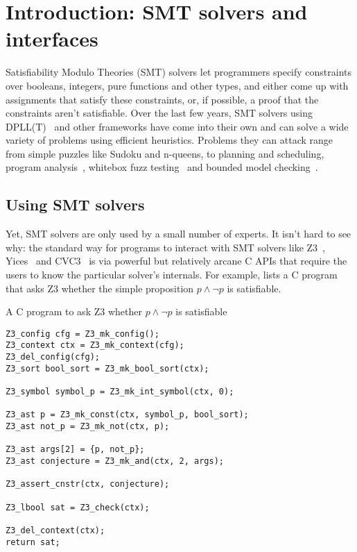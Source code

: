 \chapter{Introduction: SMT solvers and interfaces}
\label{chap:intro}

Satisfiability Modulo Theories (SMT) solvers let programmers specify constraints
over booleans, integers, pure functions and other types, and either come up
with assignments that satisfy these constraints, or, if possible, a proof that
the constraints aren't satisfiable. Over the last few years, SMT solvers using
DPLL(T)~\cite{dpllt:04} and other frameworks have come into their own and can
solve a wide variety of problems using efficient heuristics. Problems they can
attack range from simple puzzles like Sudoku and n-queens, to planning and
scheduling, program analysis~\cite{Gulwani:08}, whitebox fuzz
testing~\cite{Godefroid:08} and bounded model checking~\cite{Armando:09}.

\section{Using SMT solvers}
\label{sec:usingsmt}

Yet, SMT solvers are only used by a small number of experts. It isn't hard to
see why: the standard way for programs to interact with SMT solvers like
Z3~\cite{z3}, Yices~\cite{yices} and CVC3~\cite{cvc3} is via powerful but
relatively arcane C APIs that require the users to know the particular
solver's internals. For example,  lists a C program that
asks Z3 whether the simple proposition $p \wedge \neg p$ is satisfiable.

\begin{program}
\caption{A C program to ask Z3 whether $p \wedge \neg p$ is satisfiable}
\label{fig:c-prop}
\begin{verbatim}
Z3_config cfg = Z3_mk_config();
Z3_context ctx = Z3_mk_context(cfg);
Z3_del_config(cfg);
Z3_sort bool_sort = Z3_mk_bool_sort(ctx);

Z3_symbol symbol_p = Z3_mk_int_symbol(ctx, 0);

Z3_ast p = Z3_mk_const(ctx, symbol_p, bool_sort);
Z3_ast not_p = Z3_mk_not(ctx, p);

Z3_ast args[2] = {p, not_p};
Z3_ast conjecture = Z3_mk_and(ctx, 2, args);

Z3_assert_cnstr(ctx, conjecture);

Z3_lbool sat = Z3_check(ctx);

Z3_del_context(ctx);
return sat;
\end{verbatim}
\end{program}

